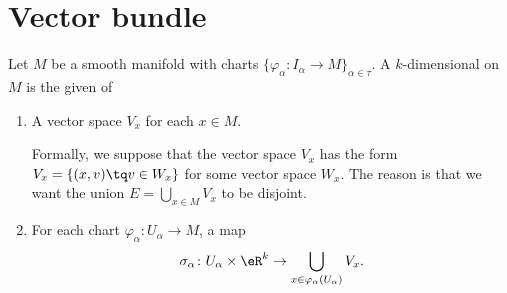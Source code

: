 
\section{Vector bundle}

\begin{definition}		\label{DEFooFRPLooTxMUzg}
	Let \( M\) be a smooth manifold with charts \( \{ \varphi_{\alpha} \colon I_{\alpha}\to M   \}_{\alpha\in \tau}\). A \( k\)-dimensional  on \( M\) is the given of
	\begin{enumerate}
		\item
		      A vector space \( V_x\) for each \( x\in M\).

		      Formally, we suppose that the vector space \( V_x\) has the form \( V_x=\{ (x,v)\tq v\in W_x \}\) for some vector space \( W_x\). The reason is that we want the union \( E=\bigcup_{x\in M}V_x\) to be disjoint.
		\item
		      For each chart \(\varphi_{\alpha} \colon U_{\alpha}\to M  \), a map
		      \begin{equation}
			      \sigma_{\alpha} \colon U_{\alpha}\times \eR^k\to \bigcup_{x\in \varphi_{\alpha}(U_{\alpha})}V_x.
		      \end{equation}
	\end{enumerate}


\end{definition}
